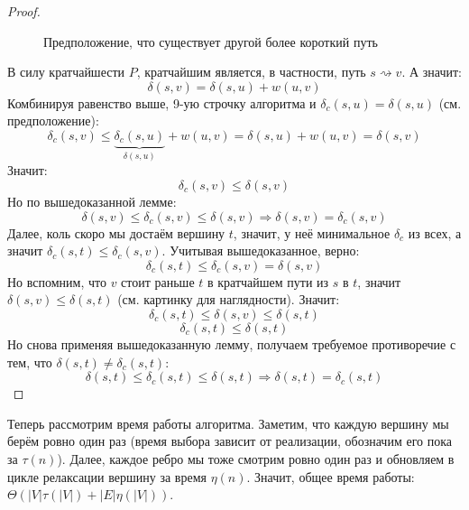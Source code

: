 \begin{proof}
\begin{figure}[H]
\caption{Предположение, что существует другой более короткий путь}
\label{fig:cut}
\end{figure}
В силу кратчайшести $P$, кратчайшим является, в частности, путь $s \rightsquigarrow v$. А значит:
\begin{equation*}
    \delta(s, v) = \delta(s, u) + w(u, v)
\end{equation*}
Комбинируя равенство выше, 9-ую строчку алгоритма и $\delta_c(s, u) = \delta(s, u)$ (см. предположение):
\begin{equation*}
    \delta_c(s, v) \leq \underbrace{\delta_c(s, u)}_{\delta(s, u)} + w(u, v) = \delta(s, u) + w(u, v) = \delta(s, v)
\end{equation*}
Значит:
\begin{equation*}
    \delta_c(s, v) \leq \delta(s, v)
\end{equation*}
Но по вышедоказанной лемме:
\begin{equation*}
    \delta(s, v) \leq \delta_c(s, v) \leq \delta(s, v) \Rightarrow \delta(s, v) = \delta_c(s, v)
\end{equation*}
Далее, коль скоро мы достаём вершину $t$, значит, у неё минимальное $\delta_c$ из всех, а значит $\delta_c(s, t) \leq \delta_c(s, v)$. Учитывая вышедоказанное, верно:
\begin{equation*}
    \delta_c(s, t) \leq \delta_c(s, v) = \delta(s, v)
\end{equation*}
Но вспомним, что $v$ стоит раньше $t$ в кратчайшем пути из $s$ в $t$, значит $\delta(s, v) \leq \delta(s, t)$ (см. картинку для наглядности). Значит:
\begin{equation*}
    \delta_c(s, t) \leq \delta(s, v) \leq \delta(s, t)
\end{equation*}
\begin{equation*}
    \delta_c(s, t) \leq \delta(s, t)
\end{equation*}
Но снова применяя вышедоказанную лемму, получаем требуемое противоречие с тем, что $\delta(s, t) \neq \delta_c(s, t)$:
\begin{equation*}
    \delta(s, t) \leq \delta_c(s, t) \leq \delta(s, t) \Rightarrow \delta(s, t) = \delta_c(s, t)
\end{equation*}

\end{proof}

Теперь рассмотрим время работы алгоритма. Заметим, что каждую вершину мы берём ровно один раз (время выбора зависит от реализации, обозначим его пока за $\tau(n)$). Далее, каждое ребро мы тоже смотрим ровно один раз и обновляем в цикле релаксации вершину за время $\eta(n)$. Значит, общее время работы: $\Theta(|V| \tau(|V|) + |E| \eta(|V|))$.

